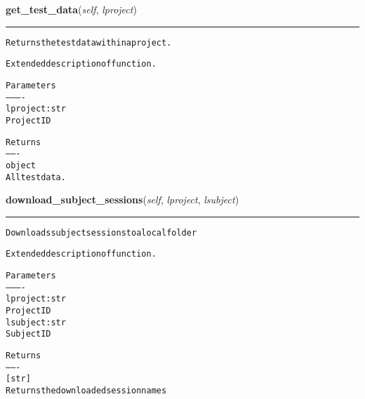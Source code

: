     \label{source:Xnat:Xnat:get_test_data}

    \vspace{0.5ex}

\hspace{.8\funcindent}\begin{boxedminipage}{\funcwidth}

    \raggedright \textbf{get\_test\_data}(\textit{self}, \textit{lproject})

    \vspace{-1.5ex}

    \rule{\textwidth}{0.5\fboxrule}
\setlength{\parskip}{2ex}
\begin{alltt}

Returns the test data within a project.

Extended description of function.

Parameters
----------
lproject : str
    Project ID

Returns
-------
object
    All test data.
\end{alltt}

\setlength{\parskip}{1ex}
    \end{boxedminipage}

    \label{source:Xnat:Xnat:download_subject_sessions}

    \vspace{0.5ex}

\hspace{.8\funcindent}\begin{boxedminipage}{\funcwidth}

    \raggedright \textbf{download\_subject\_sessions}(\textit{self}, \textit{lproject}, \textit{lsubject})

    \vspace{-1.5ex}

    \rule{\textwidth}{0.5\fboxrule}
\setlength{\parskip}{2ex}
\begin{alltt}

Downloads subject sessions to a local folder

Extended description of function.

Parameters
----------
lproject : str
    Project ID
lsubject : str
    Subject ID

Returns
-------
[str]
    Returns the downloaded session names
\end{alltt}

\setlength{\parskip}{1ex}
    \end{boxedminipage}

